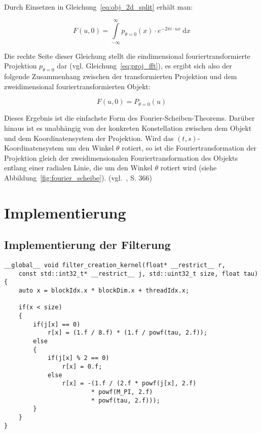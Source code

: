 Durch Einsetzen in Gleichung~\ref{eq:obj_2d_split} erhält man:

\begin{equation}
    F(u, 0) = \int\limits_{-\infty}^{\infty} p_{\theta = 0}(x) \cdot e^{-2 \pi i \cdot u x}\ \mathrm{d} x
\end{equation}

Die rechte Seite dieser Gleichung stellt die eindimensional fouriertransformierte Projektion $p_{\theta = 0}$ dar (vgl.
Gleichung~\ref{eq:proj_fft}), es ergibt sich also der folgende Zusammenhang zwischen der transformierten Projektion und
dem zweidimensional fouriertransformierten Objekt:

\begin{equation}
    F(u, 0) = P_{\theta = 0}(u)
\end{equation}

Dieses Ergebnis ist die einfachste Form des Fourier-Scheiben-Theorems. Darüber hinaus ist es unabhängig von der
konkreten Konstellation zwischen dem Objekt und dem Koordinatensystem der Projektion. Wird das
$(t, s)$-Koordinatensystem um den Winkel $\theta$ rotiert, so ist die Fouriertransformation der Projektion gleich der
zweidimensionalen Fouriertransformation des Objekts entlang einer radialen Linie, die um den Winkel $\theta$ rotiert
wird (siehe Abbildung~\ref{fig:fourier_scheibe}). (vgl.~\cite{rosenkak}, S. 366)

\chapter{Implementierung}

\section{Implementierung der Filterung}

\begin{code}
\begin{verbatim}
__global__ void filter_creation_kernel(float* __restrict__ r,
    const std::int32_t* __restrict__ j, std::uint32_t size, float tau)
{
    auto x = blockIdx.x * blockDim.x + threadIdx.x;

    if(x < size)
    {
        if(j[x] == 0)
            r[x] = (1.f / 8.f) * (1.f / powf(tau, 2.f));
        else
        {
            if(j[x] % 2 == 0)
                r[x] = 0.f;
            else
                r[x] = -(1.f / (2.f * powf(j[x], 2.f)
                        * powf(M_PI, 2.f)
                        * powf(tau, 2.f)));
        }
    }
}
\end{verbatim}
\label{app:filter_gen}
\end{code}

